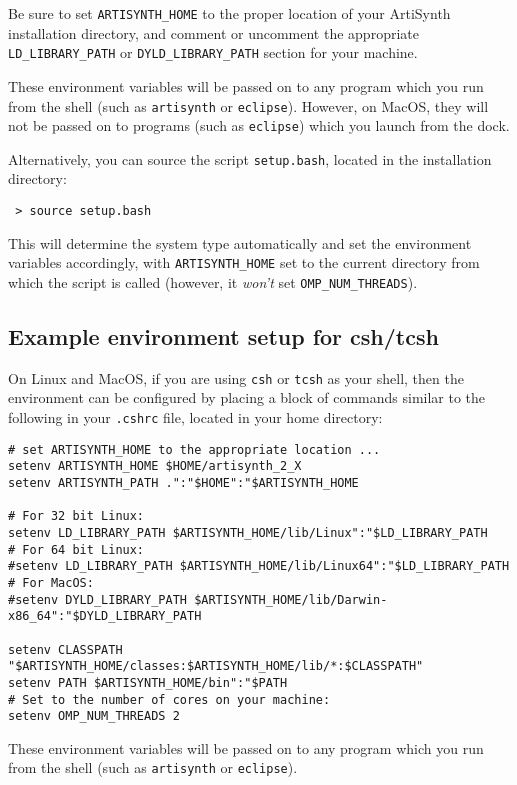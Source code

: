 \documentclass{article}
\begin{document}
Be sure to set {\tt ARTISYNTH\_HOME} to the proper location of your
ArtiSynth installation directory, and comment or uncomment the
appropriate {\tt LD\_LIBRARY\_PATH} or {\tt DYLD\_LIBRARY\_PATH} section for your
machine.

These environment variables will be passed on to any program which you
run from the shell (such as {\tt artisynth} or {\tt eclipse}).  However, on
MacOS, they will not be passed on to programs (such as {\tt eclipse})
which you launch from the dock.

Alternatively, you can source the script {\tt setup.bash}, located in
the installation directory:

\begin{verbatim}
 > source setup.bash
\end{verbatim}

This will determine the system type automatically and set the
environment variables accordingly, with {\tt ARTISYNTH\_HOME} set to the
current directory from which the script is called (however,
it {\it won't} set {\tt OMP\_NUM\_THREADS}).

\subsection{Example environment setup for csh/tcsh}
\label{tcshEnvSec}

On Linux and MacOS, if you are using {\tt csh} or {\tt tcsh} as your
shell, then the environment can be configured by placing a block of
commands similar to the following
in your {\tt .cshrc} file, located in your home directory:

\begin{lstlisting}
# set ARTISYNTH_HOME to the appropriate location ...
setenv ARTISYNTH_HOME $HOME/artisynth_2_X
setenv ARTISYNTH_PATH .":"$HOME":"$ARTISYNTH_HOME

# For 32 bit Linux:
setenv LD_LIBRARY_PATH $ARTISYNTH_HOME/lib/Linux":"$LD_LIBRARY_PATH
# For 64 bit Linux:
#setenv LD_LIBRARY_PATH $ARTISYNTH_HOME/lib/Linux64":"$LD_LIBRARY_PATH
# For MacOS:
#setenv DYLD_LIBRARY_PATH $ARTISYNTH_HOME/lib/Darwin-x86_64":"$DYLD_LIBRARY_PATH

setenv CLASSPATH "$ARTISYNTH_HOME/classes:$ARTISYNTH_HOME/lib/*:$CLASSPATH"
setenv PATH $ARTISYNTH_HOME/bin":"$PATH
# Set to the number of cores on your machine:
setenv OMP_NUM_THREADS 2 
\end{lstlisting}

These environment variables will be passed on to any program which you
run from the shell (such as {\tt artisynth} or {\tt eclipse}). 
\end{document}
